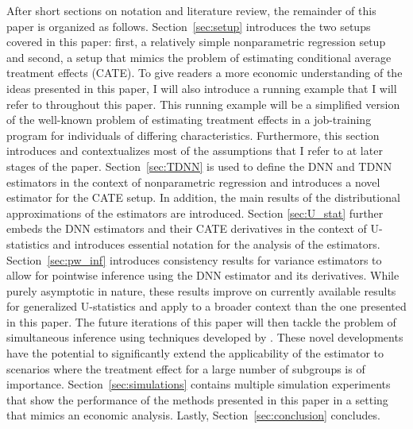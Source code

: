 After short sections on notation and literature review, the remainder of this paper is organized as follows.
Section~\ref{sec:setup} introduces the two setups covered in this paper: first, a relatively simple nonparametric regression setup and second, a setup that mimics the problem of estimating conditional average treatment effects (CATE).
To give readers a more economic understanding of the ideas presented in this paper, I will also introduce a running example that I will refer to throughout this paper.
This running example will be a simplified version of the well-known problem of estimating treatment effects in a job-training program for individuals of differing characteristics.
Furthermore, this section introduces and contextualizes most of the assumptions that I refer to at later stages of the paper.
Section~\ref{sec:TDNN} is used to define the DNN and TDNN estimators in the context of nonparametric regression and introduces a novel estimator for the CATE setup.
In addition, the main results of the distributional approximations of the estimators are introduced.
Section \ref{sec:U_stat} further embeds the DNN estimators and their CATE derivatives in the context of U-statistics and introduces essential notation for the analysis of the estimators.
Section~\ref{sec:pw_inf} introduces consistency results for variance estimators to allow for pointwise inference using the DNN estimator and its derivatives.
While purely asymptotic in nature, these results improve on currently available results for generalized U-statistics and apply to a broader context than the one presented in this paper.
The future iterations of this paper will then tackle the problem of simultaneous inference using techniques developed by \citet{ritzwoller_simultaneous_2024}.
These novel developments have the potential to significantly extend the applicability of the estimator to scenarios where the treatment effect for a large number of subgroups is of importance.
Section~\ref{sec:simulations} contains multiple simulation experiments that show the performance of the methods presented in this paper in a setting that mimics an economic analysis.
Lastly, Section~\ref{sec:conclusion} concludes.


